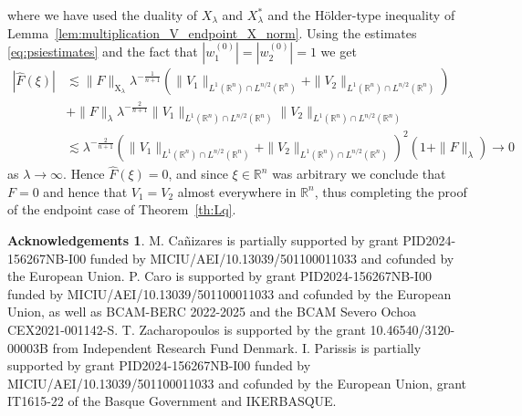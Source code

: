 \documentclass[11pt,a4paper]{amsart}
\theoremstyle{remark}
\theoremstyle{definition}
\newtheorem*{acknowledgements}{Acknowledgements}
\newcommand{\R}{\mathbb{R}}
\newcommand{\X}{\mathrm{X}}
\def\wh{\widehat}
\begin{document}
where we have used the duality of $X_\lambda$ and $X_\lambda ^*$ and the H\"older-type inequality of Lemma~\ref{lem:multiplication_V_endpoint_X_norm}. Using the estimates \eqref{eq:psiestimates} and the fact that $|w^{(0)}_1|=|w^{(0)}_2|=1$ we get
\begin{align*}
|\wh{F}(\xi)| &\lesssim 
 \|F\|_{\X_\lambda} \lambda^{-\frac{1}{n+1}}(\|V_1\|_{L^1(\R^n)\cap L^{n/2}(\R^n)} + \|V_2\|_{L^1(\R^n)\cap L^{n/2}(\R^n)}) \\
&+ \|F\|_{\lambda} \lambda^{-\frac{2}{n+1}} \|V_1\|_{L^1(\R^n)\cap L^{n/2}(\R^n)} \|V_2\|_{L^1(\R^n)\cap L^{n/2}(\R^n)} \\
&\lesssim\lambda^{-\frac{2}{n+1}} \left(\|V_1\|_{L^1(\R^n)\cap L^{n/2}(\R^n)} +\|V_2\|_{L^1(\R^n)\cap L^{n/2}(\R^n)}\right) ^2 
(1 + \|F\|_{\lambda}) \to 0
\end{align*}
as $\lambda \to \infty$. Hence $\wh{F}(\xi) = 0$, and since $\xi\in\R^n$ was arbitrary we conclude that $F=0$ and hence that $V_1=V_2$ almost everywhere in $\R^n$, thus completing the proof of the endpoint case of Theorem~\ref{th:Lq}.

\sloppy
\begin{acknowledgements}
M. Ca\~nizares is partially supported by grant PID2024-156267NB-I00 funded by MICIU/AEI/10.13039/501100011033 and cofunded by the European Union. P. Caro is supported by grant PID2024-156267NB-I00 funded by MICIU/AEI/10.13039/501100011033 and cofunded by the European Union, as well as BCAM-BERC 2022-2025 and the BCAM Severo Ochoa CEX2021-001142-S. T. Zacharopoulos is supported by the grant 10.46540/3120-00003B from Independent Research Fund Denmark. I. Parissis is partially supported by grant PID2024-156267NB-I00 funded by MICIU/AEI/10.13039/501100011033 and cofunded by the European Union, grant IT1615-22 of the Basque Government and IKERBASQUE.
\end{acknowledgements}

{} 
\end{document}

